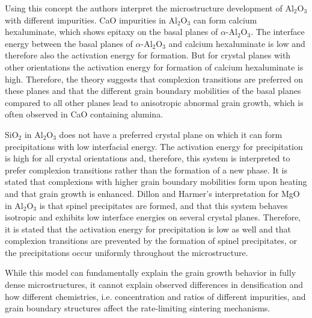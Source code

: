 Using this concept the authors interpret the microstructure development of Al$_{2}$O$_{3}$ with different impurities. CaO impurities in Al$_{2}$O$_{3}$ can form calcium hexaluminate, which shows epitaxy on the basal planes of $\alpha$-Al$_{2}$O$_{3}$. The interface energy between the basal planes of $\alpha$-Al$_{2}$O$_{3}$ and calcium hexaluminate is low and therefore also the activation energy for formation. But for crystal planes with other orientations the activation energy for formation of calcium hexaluminate is high. Therefore, the theory suggests that complexion transitions are preferred on these planes and that the different grain boundary mobilities of the basal planes compared to all other planes lead to anisotropic abnormal grain growth, which is often observed in CaO containing alumina. 

SiO$_{2}$ in Al$_{2}$O$_{3}$ does not have a preferred crystal plane on which it can form precipitations with low interfacial energy. The activation energy for precipitation is high for all crystal orientations and, therefore, this system is interpreted to prefer complexion transitions rather than the formation of a new phase. It is stated that complexions with higher grain boundary mobilities form upon heating and that grain growth is enhanced. Dillon and Harmer's \cite{Dillon2007a,Dillon2008} interpretation for MgO in Al$_{2}$O$_{3}$ is that spinel precipitates are formed, and that this system behaves isotropic and exhibits low interface energies on several crystal planes. Therefore, it is stated that the activation energy for precipitation is low as well and that complexion transitions are prevented by the formation of spinel precipitates, or the precipitations occur uniformly throughout the microstructure. 

While this model can fundamentally explain the grain growth behavior in fully dense microstructures, it cannot explain observed differences in densification and how different chemistries, i.e. concentration and ratios of different impurities, and grain boundary structures affect the rate-limiting sintering mechanisms. 

